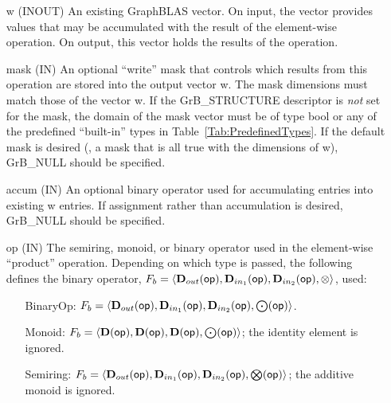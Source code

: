 \begin{itemize}[leftmargin=1.1in]
    \item[{\sf w}]    ({\sf INOUT}) An existing GraphBLAS vector.  On input,
    the vector provides values that may be accumulated with the result of the
    element-wise operation.  On output, this vector holds the results of the
    operation.

    \item[{\sf mask}] ({\sf IN}) An optional ``write'' mask that controls which
    results from this operation are stored into the output vector {\sf w}. The 
    mask dimensions must match those of the vector {\sf w}. If the 
    {\sf GrB\_STRUCTURE} descriptor is {\em not} set for the mask, the domain of the
    {\sf mask} vector must be of type {\sf bool} or any of the predefined 
    ``built-in'' types in Table~\ref{Tab:PredefinedTypes}.  If the default
    mask is desired (\ie, a mask that is all {\sf true} with the dimensions of {\sf w}), 
    {\sf GrB\_NULL} should be specified.

    \item[{\sf accum}] ({\sf IN}) An optional binary operator used for accumulating
    entries into existing {\sf w} entries.
    If assignment rather than accumulation is
    desired, {\sf GrB\_NULL} should be specified.

    \item[{\sf op}]    ({\sf IN}) The semiring, monoid, or binary operator 
    used in the element-wise ``product'' operation.  Depending on which type is
    passed, the following defines the binary operator, 
    $F_b=\langle \mbox{$\mathbf{D}_{out}$}({\sf op}),\mbox{$\mathbf{D}_{in_{1}}$}({\sf op}),\mbox{$\mathbf{D}_{in_{2}}$}({\sf op}),\otimes\rangle$, used:
    \begin{itemize}[leftmargin=1.1in]
    \item[BinaryOp:] $F_b = \langle \mbox{$\mathbf{D}_{out}$}({\sf op}), \mbox{$\mathbf{D}_{in_{1}}$}({\sf op}),
    \mbox{$\mathbf{D}_{in_{2}}$}({\sf op}),\bold{\bigodot}({\sf op})\rangle$.  
    \item[Monoid:] $F_b = \langle \bold{D}({\sf op}), \bold{D}({\sf op}),
    \bold{D}({\sf op}),\bold{\bigodot}({\sf op})\rangle$;
    the identity element is ignored. 
    \item[Semiring:] $F_b = \langle \mbox{$\mathbf{D}_{out}$}({\sf op}), \mbox{$\mathbf{D}_{in_{1}}$}({\sf op}),
    \mbox{$\mathbf{D}_{in_{2}}$}({\sf op}),\bold{\bigotimes}({\sf op})\rangle$; the
    additive monoid is ignored.
    \end{itemize}


\end{itemize}
